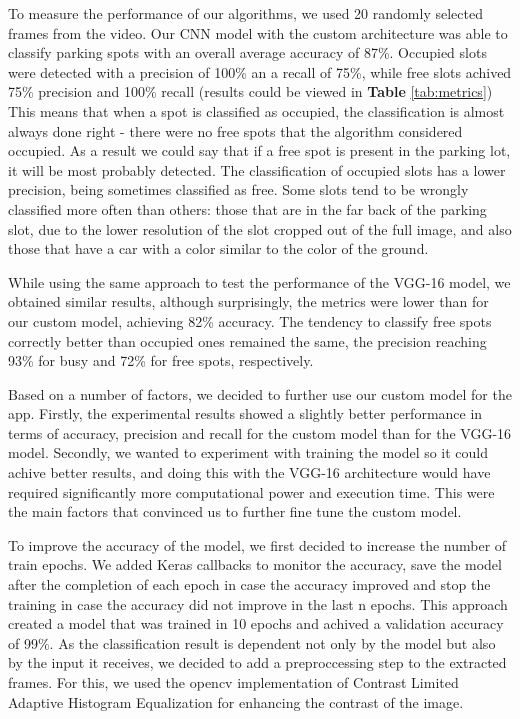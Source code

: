\documentclass[12pt]{article}
\begin{document}
To measure the performance of our algorithms, we used 20 randomly selected frames from the video. Our CNN model with the custom architecture was able to classify parking spots with an overall average accuracy of 87\%. Occupied slots were detected with a precision of 100\% an a recall of 75\%, while free slots achived 75\% precision and 100\% recall (results could be viewed in \textbf{Table} \ref{tab:metrics}) This means that when a spot is classified as occupied, the classification is almost always done right - there were no free spots that the algorithm considered occupied. As a result we could say that if a free spot is present in the parking lot, it will be most probably detected. The classification of occupied slots has a lower precision, being sometimes classified as free. Some slots tend to be wrongly classified more often than others: those that are in the far back of the parking slot, due to the lower resolution of the slot cropped out of the full image, and also those that have a car with a color similar to the color of the ground.

While using the same approach to test the performance of the VGG-16 model, we obtained similar results, although surprisingly, the metrics were lower than for our custom model, achieving 82\% accuracy. The tendency to classify free spots correctly better than occupied ones remained the same, the precision reaching 93\% for busy and 72\% for free spots, respectively. 

Based on a number of factors, we decided to further use our custom model for the app. Firstly, the experimental results showed a slightly better performance in terms of accuracy, precision and recall for the custom model than for the VGG-16 model. Secondly, we wanted to experiment with training the model so it could achive better results, and doing this with the VGG-16 architecture would have required significantly more computational power and execution time. This were the main factors that convinced us to further fine tune the custom model.

To improve the accuracy of the model, we first decided to increase the number of train epochs. We added Keras callbacks to monitor the accuracy, save the model after the completion of each epoch in case the accuracy improved and stop the training in case the accuracy did not improve in the last n epochs. This approach created a model that was trained in 10 epochs and achived a validation accuracy of 99\%.
As the classification result is dependent not only by the model but also by the input it receives, we decided to add a preproccessing step to the extracted frames. For this, we used the opencv implementation of Contrast Limited Adaptive Histogram Equalization for enhancing the contrast of the image.
\end{document}
